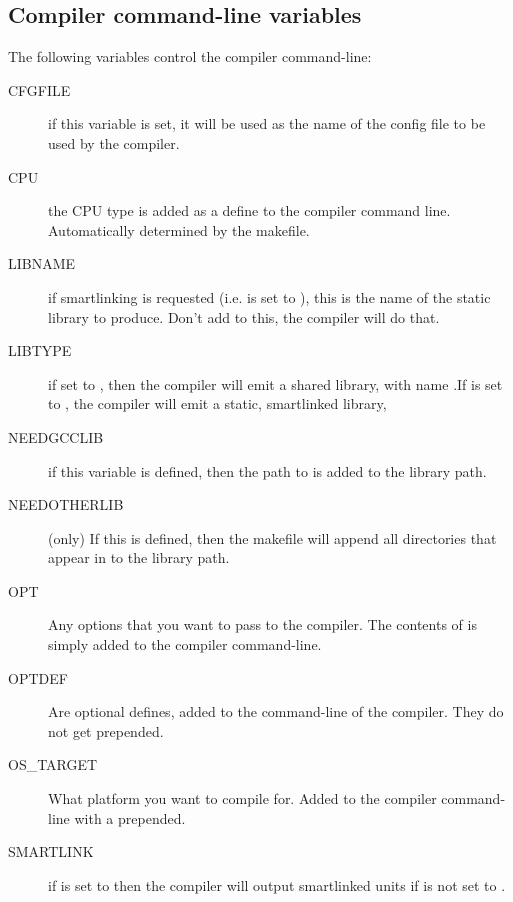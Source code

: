 \documentclass{report}
\begin{document}
\subsection{Compiler command-line variables}

The following variables control the compiler command-line:
\begin{description}
\item[CFGFILE] if this variable is set, it will be used as the name of the
config file to be used by the compiler.

\item[CPU] the CPU type is added as a define to the compiler command line.
Automatically determined by the makefile.

\item[LIBNAME] if smartlinking is requested (i.e.  is set to
), this is the name of the static library to produce. Don't add
 to this, the compiler will do that.

\item[LIBTYPE] if set to , then the compiler will emit a shared
library, with name .If  is set to ,
the compiler will emit a static, smartlinked library,

\item[NEEDGCCLIB] if this variable is defined, then the path to 
is added to the library path.

\item[NEEDOTHERLIB] (\linux only) If this is defined, then the makefile will
append all directories that appear in  to the library path.


\item[OPT] Any options that you want to pass to the compiler. The contents
of  is simply added to the compiler command-line.

\item[OPTDEF] Are optional defines, added to the command-line of the
compiler. They do not get  prepended.

\item[OS\_TARGET] What platform you want to compile for. Added to the
compiler command-line with a  prepended.

\item[SMARTLINK] if  is set to  then the compiler
will output smartlinked units if  is not set to .

\end{description}
\end{document}
